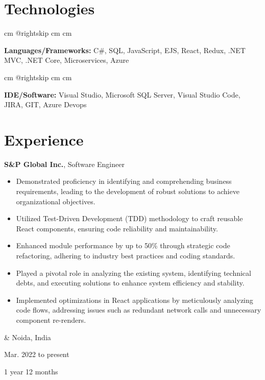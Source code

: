 \documentclass[10pt, letterpaper]{article}
\newenvironment{highlights}{
        \begin{itemize}[
                topsep=0pt,
                parsep=0.10 cm,
                partopsep=0pt,
                itemsep=0pt,
                after=\vspace{-1\baselineskip},
                leftmargin=0.4 cm + 3pt
            ]
    }{
        \end{itemize}
    } %
\let\originalTabularx\tabularx
\let\originalEndTabularx\endtabularx
\renewenvironment{tabularx}{\bgroup\centering\originalTabularx}{\originalEndTabularx\par\egroup}
\begin{document}
    
    \section{Technologies}

        \begingroup{} cm
        \advance\csname @rightskip cm
        \advance{} cm

        \textbf{Languages/Frameworks:} C\#, SQL, JavaScript, EJS, React, Redux, .NET MVC, .NET Core, Microservices, Azure \par\endgroup

        \vspace{0.2 cm}
        \begingroup{} cm
        \advance\csname @rightskip cm
        \advance{} cm

        \textbf{IDE/Software:} Visual Studio, Microsoft SQL Server, Visual Studio Code, JIRA, GIT, Azure Devops \par\endgroup


    
    \section{Experience}

        \begin{tabularx}{
            \textwidth-0.4 cm-0.13cm
        }{
            K{0.2 cm}
            R{4.1 cm}
        }
            \textbf{S\&P Global Inc.}, Software Engineer

            \vspace{0.10 cm}

            \begin{highlights}
                \item Demonstrated proficiency in identifying and comprehending business requirements, leading to the development of robust solutions to achieve organizational objectives.
                \item Utilized Test-Driven Development (TDD) methodology to craft reusable React components, ensuring code reliability and maintainability.
                \item Enhanced module performance by up to 50\% through strategic code refactoring, adhering to industry best practices and coding standards.
                \item Played a pivotal role in analyzing the existing system, identifying technical debts, and executing solutions to enhance system efficiency and stability.
                \item Implemented optimizations in React applications by meticulously analyzing code flows, addressing issues such as redundant network calls and unnecessary component re-renders.
            \end{highlights}
            &
            Noida, India

            Mar. 2022 to present

            1 year 12 months
        \end{tabularx}
\end{document}
